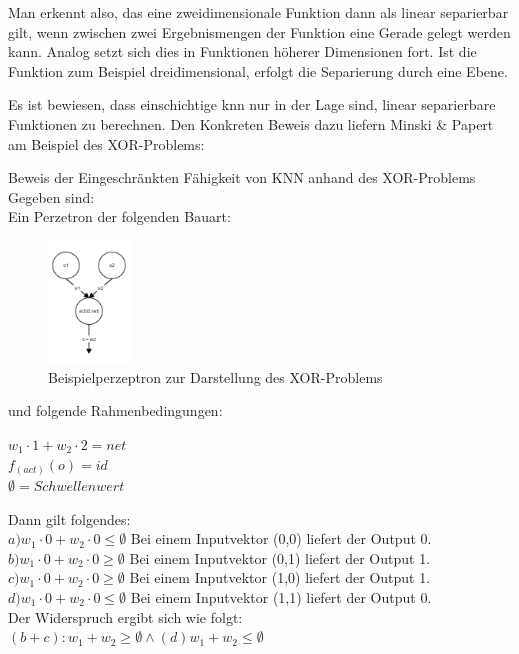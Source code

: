 Man erkennt also, das eine zweidimensionale Funktion dann als linear separierbar gilt, wenn zwischen zwei Ergebnismengen der Funktion eine Gerade gelegt werden kann. Analog setzt sich dies in Funktionen höherer Dimensionen fort. Ist die Funktion zum Beispiel dreidimensional, erfolgt die Separierung durch eine Ebene.

Es ist bewiesen, dass einschichtige \acs{knn} nur in der Lage sind, linear separierbare Funktionen zu berechnen. Den Konkreten Beweis dazu liefern Minski \& Papert am Beispiel des XOR-Problems:

\begin{bew}Beweis der Eingeschränkten Fähigkeit von KNN anhand des XOR-Problems\\

Gegeben sind:\\

Ein Perzetron der folgenden Bauart:

\begin{figure}[H]
\centering
		\includegraphics[width=0.20\textwidth]{Perzeptron.PNG}
	\caption{Beispielperzeptron zur Darstellung des XOR-Problems}
	\label{fig:Beispielperzeptron zur Darstellung des XOR-Problems}
\end{figure}

und folgende Rahmenbedingungen:

$w_1\cdot1 + w_2\cdot2 = net$\\ 
$f_(act)(o) = id$ \\
$\emptyset = Schwellenwert$

Dann gilt folgendes:\\
$a) w_1\cdot0 + w_2\cdot0 \le \emptyset$ Bei einem Inputvektor (0,0) liefert der Output 0.\\
$b) w_1\cdot0 + w_2\cdot0 \geq \emptyset$ Bei einem Inputvektor (0,1) liefert der Output 1.\\
$c) w_1\cdot0 + w_2\cdot0 \geq \emptyset$ Bei einem Inputvektor (1,0) liefert der Output 1.\\
$d) w_1\cdot0 + w_2\cdot0 \le \emptyset$ Bei einem Inputvektor (1,1) liefert der Output 0.\\

Der Widerspruch ergibt sich wie folgt:\\ $(b+c):  w_1 + w_2 \geq \emptyset  \wedge (d)  w_1 + w_2 \leq \emptyset$
\end{bew}

